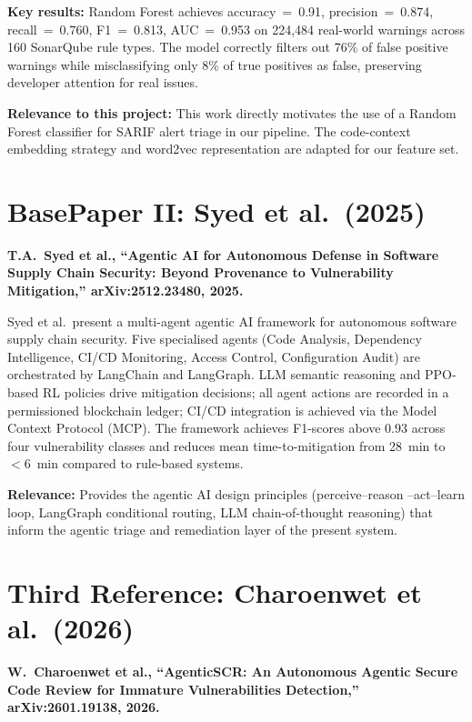 \textbf{Key results:} Random Forest achieves accuracy~=~0.91, precision~=~0.874,
recall~=~0.760, F1~=~0.813, AUC~=~0.953 on 224,484 real-world warnings across
160 SonarQube rule types. The model correctly filters out 76\% of false positive
warnings while misclassifying only 8\% of true positives as false, preserving
developer attention for real issues.

\textbf{Relevance to this project:} This work directly motivates the use of a
Random Forest classifier for SARIF alert triage in our pipeline. The code-context
embedding strategy and word2vec representation are adapted for our feature set.

\section{BasePaper II: Syed et al.\ (2025)}
\label{sec:bp2}

\textbf{T.A.\ Syed et al., ``Agentic AI for Autonomous Defense in Software Supply
Chain Security: Beyond Provenance to Vulnerability Mitigation,'' arXiv:2512.23480,
2025.} \cite{syed2025agentic}

Syed et al.\ present a multi-agent agentic AI framework for autonomous software
supply chain security. Five specialised agents (Code Analysis, Dependency
Intelligence, CI/CD Monitoring, Access Control, Configuration Audit) are
orchestrated by LangChain and LangGraph. LLM semantic reasoning and PPO-based RL
policies drive mitigation decisions; all agent actions are recorded in a
permissioned blockchain ledger; CI/CD integration is achieved via the Model Context
Protocol (MCP). The framework achieves F1-scores above 0.93 across four
vulnerability classes and reduces mean time-to-mitigation from 28~min to
$<$6~min compared to rule-based systems.

\textbf{Relevance:} Provides the agentic AI design principles (perceive--reason
--act--learn loop, LangGraph conditional routing, LLM chain-of-thought reasoning)
that inform the agentic triage and remediation layer of the present system.

\section{Third Reference: Charoenwet et al.\ (2026)}
\label{sec:3rd}

\textbf{W.\ Charoenwet et al., ``AgenticSCR: An Autonomous Agentic Secure Code
Review for Immature Vulnerabilities Detection,'' arXiv:2601.19138, 2026.}
\cite{charoenwet2026agenticscr}

